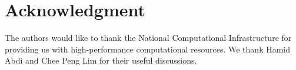 \documentclass[journal]{IEEEtran}
\begin{document}
\section*{Acknowledgment}


The authors would like to thank the National Computational Infrastructure for providing us with high-performance computational resources. We thank Hamid Abdi and Chee Peng Lim for their useful discussions.


\ifCLASSOPTIONcaptionsoff
  \newpage
\fi{\small


}
\end{document}
